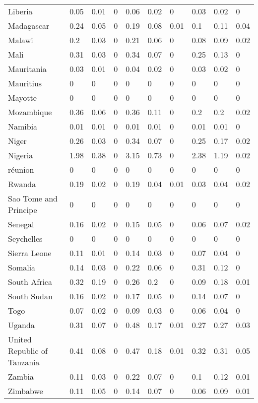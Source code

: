 \begin{longtable}[t]{llllllllll}
Liberia & 0.05 & 0.01 & 0 & 0.06 & 0.02 & 0 & 0.03 & 0.02 & 0\\
Madagascar & 0.24 & 0.05 & 0 & 0.19 & 0.08 & 0.01 & 0.1 & 0.11 & 0.04\\
Malawi & 0.2 & 0.03 & 0 & 0.21 & 0.06 & 0 & 0.08 & 0.09 & 0.02\\
Mali & 0.31 & 0.03 & 0 & 0.34 & 0.07 & 0 & 0.25 & 0.13 & 0\\
Mauritania & 0.03 & 0.01 & 0 & 0.04 & 0.02 & 0 & 0.03 & 0.02 & 0\\
Mauritius & 0 & 0 & 0 & 0 & 0 & 0 & 0 & 0 & 0\\
Mayotte & 0 & 0 & 0 & 0 & 0 & 0 & 0 & 0 & 0\\
Mozambique & 0.36 & 0.06 & 0 & 0.36 & 0.11 & 0 & 0.2 & 0.2 & 0.02\\
Namibia & 0.01 & 0.01 & 0 & 0.01 & 0.01 & 0 & 0.01 & 0.01 & 0\\
Niger & 0.26 & 0.03 & 0 & 0.34 & 0.07 & 0 & 0.25 & 0.17 & 0.02\\
Nigeria & 1.98 & 0.38 & 0 & 3.15 & 0.73 & 0 & 2.38 & 1.19 & 0.02\\
réunion & 0 & 0 & 0 & 0 & 0 & 0 & 0 & 0 & 0\\
Rwanda & 0.19 & 0.02 & 0 & 0.19 & 0.04 & 0.01 & 0.03 & 0.04 & 0.02\\
Sao Tome and Principe & 0 & 0 & 0 & 0 & 0 & 0 & 0 & 0 & 0\\
Senegal & 0.16 & 0.02 & 0 & 0.15 & 0.05 & 0 & 0.06 & 0.07 & 0.02\\
Seychelles & 0 & 0 & 0 & 0 & 0 & 0 & 0 & 0 & 0\\
Sierra Leone & 0.11 & 0.01 & 0 & 0.14 & 0.03 & 0 & 0.07 & 0.04 & 0\\
Somalia & 0.14 & 0.03 & 0 & 0.22 & 0.06 & 0 & 0.31 & 0.12 & 0\\
South Africa & 0.32 & 0.19 & 0 & 0.26 & 0.2 & 0 & 0.09 & 0.18 & 0.01\\
South Sudan & 0.16 & 0.02 & 0 & 0.17 & 0.05 & 0 & 0.14 & 0.07 & 0\\
Togo & 0.07 & 0.02 & 0 & 0.09 & 0.03 & 0 & 0.06 & 0.04 & 0\\
Uganda & 0.31 & 0.07 & 0 & 0.48 & 0.17 & 0.01 & 0.27 & 0.27 & 0.03\\
United Republic of Tanzania & 0.41 & 0.08 & 0 & 0.47 & 0.18 & 0.01 & 0.32 & 0.31 & 0.05\\
Zambia & 0.11 & 0.03 & 0 & 0.22 & 0.07 & 0 & 0.1 & 0.12 & 0.01\\
Zimbabwe & 0.11 & 0.05 & 0 & 0.14 & 0.07 & 0 & 0.06 & 0.09 & 0.01\\*
\end{longtable}
\endgroup{}
